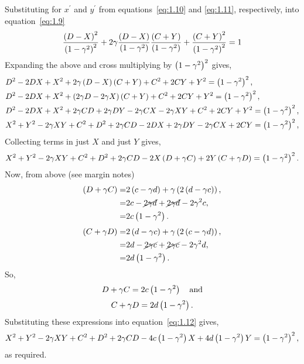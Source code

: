Substituting for $x^\prime$ and $y^\prime$ from equations~\eqref{eq:1.10} and \eqref{eq:1.11}, respectively, into equation~\eqref{eq:1.9}
\[
	\frac{\left(D-X\right)^2}{\left(1-\gamma^2\right)^2} +2\gamma\frac{\left(D-X\right)}{\left(1-\gamma^2\right)}\frac{\left(C+Y\right)}{\left(1-\gamma^2\right)} + \frac{\left(C+Y\right)^2}{\left(1-\gamma^2\right)^2} = 1
\]
Expanding the above and cross multiplying by $\left(1-\gamma^2\right)^2$ gives,
\begin{align*}
{}&D^2 -2DX + X^2 + 2\gamma\left(D-X\right)\left(C+Y\right) + C^2 + 2CY + Y^2 = \left(1-\gamma^2\right)^2,\\
{}&D^2 -2DX + X^2 + \left(2\gamma D -2\gamma X\right)\left(C+Y\right) + C^2 + 2CY + Y^2 = \left(1-\gamma^2\right)^2,\\
{}&D^2 -2DX + X^2 + 2\gamma CD + 2\gamma DY  -2\gamma CX -2\gamma XY + C^2 + 2CY + Y^2 = \left(1-\gamma^2\right)^2,\\
{}&X^2+Y^2-2\gamma XY + C^2 + D^2 + 2\gamma CD -2DX+2\gamma DY - 2\gamma CX +2CY = \left(1-\gamma^2\right)^2,\\
\end{align*}
Collecting terms in just $X$ and just $Y$ gives,
\begin{equation}
\label{eq:1.12}
X^2+Y^2-2\gamma XY +C^2+D^2+2\gamma CD - 2X\left(D+\gamma C\right) + 2Y\left(C+\gamma D\right) = \left(1-\gamma^2\right)^2.
\end{equation}
Now, from above (see margin notes)
\begin{align*}
\left(D + \gamma C\right) =& 2\left(c-\gamma d\right) + \gamma\left(2\left(d-\gamma c\right)\right),\\
=& 2c - \cancel{2\gamma d} +  \cancel{2\gamma d} -2\gamma^2c,\\
=& 2c\left(1-\gamma^2\right).
\end{align*}
\begin{align*}
\left(C + \gamma D\right) =& 2\left(d-\gamma c\right) + \gamma\left(2\left(c-\gamma d\right)\right),\\
=& 2d - \cancel{2\gamma c} +  \cancel{2\gamma c} -2\gamma^2d,\\
=& 2d\left(1-\gamma^2\right).
\end{align*}
So,
\[
	D + \gamma C = 2c\left(1-\gamma^2\right)\quad\text{and}
\]
\[
	C + \gamma D = 2d\left(1-\gamma^2\right).
\]
Substituting these expressions into equation~\eqref{eq:1.12} gives,
\[
X^2+Y^2-2\gamma XY +C^2+D^2+2\gamma CD - 4c\left(1-\gamma^2\right) X + 4d\left(1-\gamma^2\right) Y = \left(1-\gamma^2\right)^2,
\]
as required.

